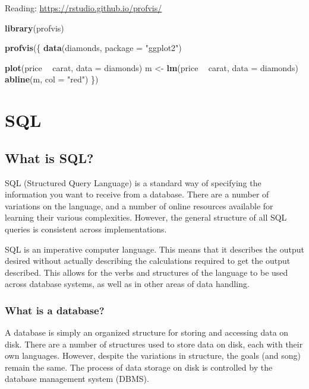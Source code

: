 \documentclass[]{book}
\newenvironment{Shaded}{\begin{snugshade}}{\end{snugshade}}
\newcommand{\KeywordTok}[1]{\textcolor[rgb]{0.13,0.29,0.53}{\textbf{#1}}}
\newcommand{\DataTypeTok}[1]{\textcolor[rgb]{0.13,0.29,0.53}{#1}}
\newcommand{\StringTok}[1]{\textcolor[rgb]{0.31,0.60,0.02}{#1}}
\newcommand{\OperatorTok}[1]{\textcolor[rgb]{0.81,0.36,0.00}{\textbf{#1}}}
\newcommand{\NormalTok}[1]{#1}
\theoremstyle{definition}
\theoremstyle{definition}
\theoremstyle{definition}
\theoremstyle{remark}
\begin{document}
Reading: \url{https://rstudio.github.io/profvis/}

\begin{Shaded}
\begin{Highlighting}[]
\KeywordTok{library}\NormalTok{(profvis)}

\KeywordTok{profvis}\NormalTok{(\{}
  \KeywordTok{data}\NormalTok{(diamonds, }\DataTypeTok{package =} \StringTok{"ggplot2"}\NormalTok{)}

  \KeywordTok{plot}\NormalTok{(price }\OperatorTok{~}\StringTok{ }\NormalTok{carat, }\DataTypeTok{data =}\NormalTok{ diamonds)}
\NormalTok{  m <-}\StringTok{ }\KeywordTok{lm}\NormalTok{(price }\OperatorTok{~}\StringTok{ }\NormalTok{carat, }\DataTypeTok{data =}\NormalTok{ diamonds)}
  \KeywordTok{abline}\NormalTok{(m, }\DataTypeTok{col =} \StringTok{"red"}\NormalTok{)}
\NormalTok{\})}
\end{Highlighting}
\end{Shaded}

\chapter{SQL}\label{databases}

\section{What is SQL?}\label{what-is-sql}

SQL (Structured Query Language) is a standard way of specifying the
information you want to receive from a database. There are a number of
variations on the language, and a number of online resources available
for learning their various complexities. However, the general structure
of all SQL queries is consistent across implementations.

SQL is an imperative computer language. This means that it describes the
output desired without actually describing the calculations required to
get the output described. This allows for the verbs and structures of
the language to be used across database systems, as well as in other
areas of data handling.

\subsection{What is a database?}\label{what-is-a-database}

A database is simply an organized structure for storing and accessing
data on disk. There are a number of structures used to store data on
disk, each with their own languages. However, despite the variations in
structure, the goals (and song) remain the same. The process of data
storage on disk is controlled by the database management system (DBMS).
\end{document}

